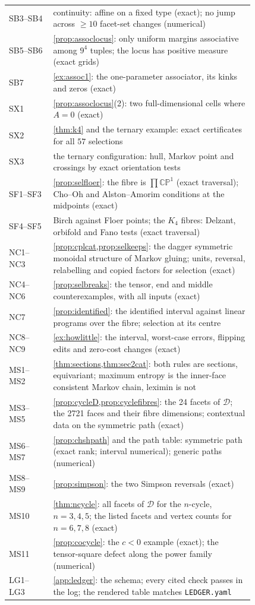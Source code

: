 \documentclass[11pt]{article}
\theoremstyle{definition}\newtheorem{definition}[theorem]{Definition}\newtheorem{remark}[theorem]{Remark}\newtheorem{example}[theorem]{Example}\newtheorem{problem}[theorem]{Open problem}\crefname{problem}{Problem}{Problems}
\begin{document}
{\begin{longtable}{lp{0.82\linewidth}}
SB3--SB4 & continuity: affine on a fixed type (exact); no jump across $\ge10$ facet-set changes (numerical)\\
SB5--SB6 & \cref{prop:assoclocus}: only uniform margins associative among $9^4$ tuples; the locus has positive measure (exact grids)\\
SB7 & \cref{ex:assoc1}: the one-parameter associator, its kinks and zeros (exact)\\
SX1 & \cref{prop:assoclocus}(2): two full-dimensional cells where $A=0$ (exact)\\
SX2 & \cref{thm:k4} and the ternary example: exact certificates for all $57$ selections\\
SX3 & the ternary configuration: hull, Markov point and crossings by exact orientation tests\\
SF1--SF3 & \cref{prop:selfloer}: the fibre is $\prod\mathbb{CP}^1$ (exact traversal); Cho--Oh and Alston--Amorim conditions at the midpoints (exact)\\
SF4--SF5 & Birch against Floer points; the $K_4$ fibres: Delzant, orbifold and Fano tests (exact traversal)\\
NC1--NC3 & \cref{prop:cplcat,prop:selkeeps}: the dagger symmetric monoidal structure of Markov gluing; units, reversal, relabelling and copied factors for selection (exact)\\
NC4--NC6 & \cref{prop:selbreaks}: the tensor, end and middle counterexamples, with all inputs (exact)\\
NC7 & \cref{prop:identified}: the identified interval against linear programs over the fibre; selection at its centre\\
NC8--NC9 & \cref{ex:howlittle}: the interval, worst-case errors, flipping edits and zero-cost changes (exact)\\
MS1--MS2 & \cref{thm:sections,thm:sec2cat}: both rules are sections, equivariant; maximum entropy is the inner-face consistent Markov chain, leximin is not\\
MS3--MS5 & \cref{prop:cycleD,prop:cyclefibres}: the 24 facets of $\mathcal D$; the 2721 faces and their fibre dimensions; contextual data on the symmetric path (exact)\\
MS6--MS7 & \cref{prop:chshpath} and the path table: symmetric path (exact rank; interval numerical); generic paths (numerical)\\
MS8--MS9 & \cref{prop:simpson}: the two Simpson reversals (exact)\\
MS10 & \cref{thm:ncycle}: all facets of $\mathcal D$ for the $n$-cycle, $n=3,4,5$; the listed facets and vertex counts for $n=6,7,8$ (exact)\\
MS11 & \cref{prop:cocycle}: the $c<0$ example (exact); the tensor-square defect along the power family (numerical)\\
LG1--LG3 & \cref{app:ledger}: the schema; every cited check passes in the log; the rendered table matches \texttt{LEDGER.yaml}\\\bottomrule
\end{longtable}}
\end{document}
